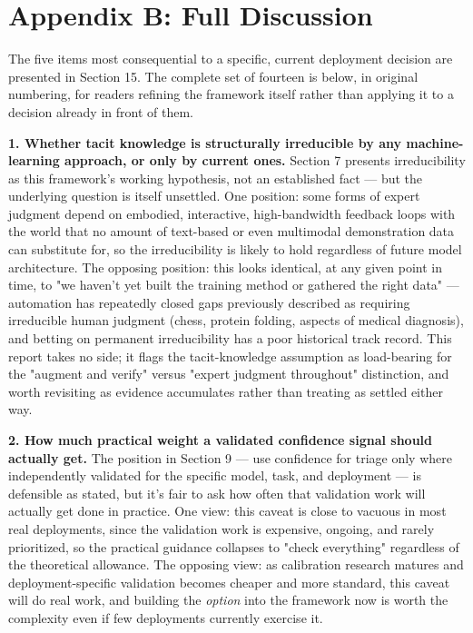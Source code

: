 \section*{Appendix B: Full Discussion}

The five items most consequential to a specific, current deployment decision are presented in Section 15. The complete set of fourteen is below, in original numbering, for readers refining the framework itself rather than applying it to a decision already in front of them.

\textbf{1. Whether tacit knowledge is structurally irreducible by any machine-learning approach, or only by current ones.} Section 7 presents irreducibility as this framework's working hypothesis, not an established fact --- but the underlying question is itself unsettled. One position: some forms of expert judgment depend on embodied, interactive, high-bandwidth feedback loops with the world that no amount of text-based or even multimodal demonstration data can substitute for, so the irreducibility is likely to hold regardless of future model architecture. The opposing position: this looks identical, at any given point in time, to "we haven't yet built the training method or gathered the right data" --- automation has repeatedly closed gaps previously described as requiring irreducible human judgment (chess, protein folding, aspects of medical diagnosis), and betting on permanent irreducibility has a poor historical track record. This report takes no side; it flags the tacit-knowledge assumption as load-bearing for the "augment and verify" versus "expert judgment throughout" distinction, and worth revisiting as evidence accumulates rather than treating as settled either way.

\textbf{2. How much practical weight a validated confidence signal should actually get.} The position in Section 9 --- use confidence for triage only where independently validated for the specific model, task, and deployment --- is defensible as stated, but it's fair to ask how often that validation work will actually get done in practice. One view: this caveat is close to vacuous in most real deployments, since the validation work is expensive, ongoing, and rarely prioritized, so the practical guidance collapses to "check everything" regardless of the theoretical allowance. The opposing view: as calibration research matures and deployment-specific validation becomes cheaper and more standard, this caveat will do real work, and building the \emph{option} into the framework now is worth the complexity even if few deployments currently exercise it.

